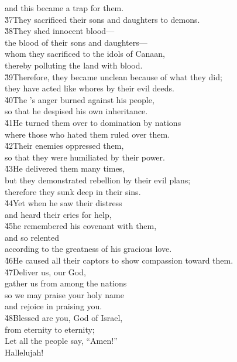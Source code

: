 \begin{poetry}
\poemll    and this became a trap for them. \\
\poeml \v{37}They sacrificed their sons and daughters to demons. \\
\poeml \v{38}They shed innocent blood--- \\
\poemll    the blood of their sons and daughters--- \\
\poeml whom they sacrificed to the idols of Canaan, \\
\poemll    thereby polluting the land with blood. \\
\poeml \v{39}Therefore, they became unclean because of what they did; \\
\poemll    they have acted like whores by their evil deeds. \\
\poeml \v{40}The 's anger burned against his people, \\
\poemll    so that he despised his own inheritance. \\
\poeml \v{41}He turned them over to domination by nations \\
\poemll    where those who hated them ruled over them. \\
\poeml \v{42}Their enemies oppressed them, \\
\poemll    so that they were humiliated by their power. \\
\poeml \v{43}He delivered them many times, \\
\poemll    but they demonstrated rebellion by their evil plans; \\
\poemlll       therefore they sunk deep in their sins. \\
\poeml \v{44}Yet when he saw their distress \\
\poemll    and heard their cries for help, \\
\poeml \v{45}he remembered his covenant with them, \\
\poemll    and so relented \\
\poemlll       according to the greatness of his gracious love. \\
\poeml \v{46}He caused all their captors to show compassion toward them. \\
\poeml \v{47}Deliver us,  our God, \\
\poemll    gather us from among the nations \\
\poeml so we may praise your holy name \\
\poemll    and rejoice in praising you. \\
\poeml \v{48}Blessed are you,  God of Israel, \\
\poemll    from eternity to eternity; \\
\poeml Let all the people say, ``Amen!'' \\
\poemll    Hallelujah!
\end{poetry}

